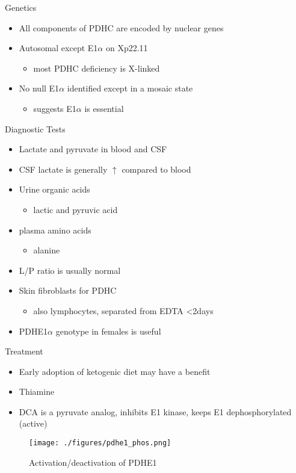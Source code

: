 \documentclass[presentation, smaller]{beamer}
\begin{document}
\begin{frame}[label={sec:orgc2dc753}]{Genetics}
\begin{itemize}
\item All components of PDHC are encoded by nuclear genes
\item Autosomal except E1\(\alpha\) on Xp22.11
\begin{itemize}
\item \therefor most PDHC deficiency is X-linked
\end{itemize}
\item No null E1\(\alpha\) identified except in a mosaic state
\begin{itemize}
\item suggests E1\(\alpha\) is essential
\end{itemize}
\end{itemize}
\end{frame}

\begin{frame}[label={sec:org91fb59e}]{Diagnostic Tests}
\begin{itemize}
\item Lactate and pyruvate in blood and CSF
\item CSF lactate is generally \(\uparrow\) compared to blood
\item Urine organic acids
\begin{itemize}
\item lactic and pyruvic acid
\end{itemize}
\item plasma amino acids
\begin{itemize}
\item alanine
\end{itemize}
\item L/P ratio is usually normal

\item Skin fibroblasts for PDHC

\begin{itemize}
\item also lymphocytes, separated from EDTA <2days
\end{itemize}

\item PDHE1\(\alpha\) genotype in females is useful
\end{itemize}
\end{frame}

\begin{frame}[label={sec:orga71fd5e}]{Treatment}
\begin{itemize}
\item Early adoption of ketogenic diet may have a benefit
\item Thiamine
\item DCA is a pyruvate analog, inhibits E1 kinase, keeps E1 dephosphorylated (active)
\end{itemize}

\begin{figure}[htbp]
\centering
\texttt{[image: ./figures/pdhe1\_phos.png]}
\caption[pdhe1]{\label{fig:org81c0652}
Activation/deactivation of PDHE1}
\end{figure}
\end{frame}
\end{document}
